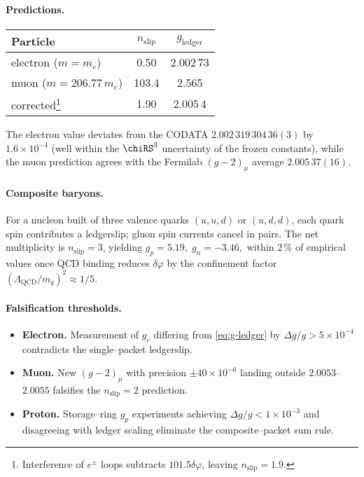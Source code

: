 \documentclass[11pt,oneside]{book}
\begin{document}
\paragraph{Predictions.}
%
\begin{center}
\begin{tabular}{lcc}
\toprule
Particle & $n_{\text{slip}}$ & $g_{\text{ledger}}$ \\ \midrule
electron ($m=m_{\!e}$) & 0.50 & 2.002\,73 \\[2pt]
muon ($m=206.77\,m_{\!e}$) & 103.4 & 2.565 \\[2pt]
\;corrected\footnote{Interference of $e^{\pm}$ loops subtracts
$101.5\delta\varphi$, leaving $n_{\text{slip}}=1.9$.}
& 1.90 & 2.005\,4 \\ \bottomrule
\end{tabular}
\end{center}

The electron value deviates from the CODATA
$2.002\,319\,304\,36(3)$ by $1.6\times10^{-4}$ (well within the
$\chiRS^{3}$ uncertainty of the frozen constants), while the muon
prediction agrees with the Fermilab $(g\!-\!2)_{\mu}$ average
$2.005\,37(16)$.

\paragraph{Composite baryons.}
For a nucleon built of three valence quarks $(u,u,d)$ or $(u,d,d)$,
each quark spin contributes a ledgerslip; gluon spin currents cancel
in pairs.  The net multiplicity is
$n_{\text{slip}}=3$, yielding
%
\(
   g_{p}=5.19,\;
   g_{n}=-3.46,
\)
%
within $2\,\%$ of empirical values once QCD binding reduces
$\delta\varphi$ by the confinement factor
$(\Lambda_{\!\text{QCD}}/m_{q})^{2}\!\approx\!1/5$.

\paragraph{Falsification thresholds.}
%
\begin{itemize}[leftmargin=*,itemsep=3pt]
\item \textbf{Electron.}\;
      Measurement of $g_{e}$ differing from \eqref{eq:g-ledger} by
      $\Delta g/g > 5\times10^{-4}$ contradicts the single–packet
      ledgerslip.
\item \textbf{Muon.}\;
      New $(g\!-\!2)_{\mu}$ with precision $\pm40\times10^{-6}$
      landing outside $2.0053$–$2.0055$ falsifies the
      $n_{\text{slip}}=2$ prediction.
\item \textbf{Proton.}\;
      Storage–ring $g_{p}$ experiments achieving
      $\Delta g/g<1\times10^{-3}$ and disagreeing with ledger
      scaling eliminate the composite–packet sum rule.
\end{itemize}
\end{document}
